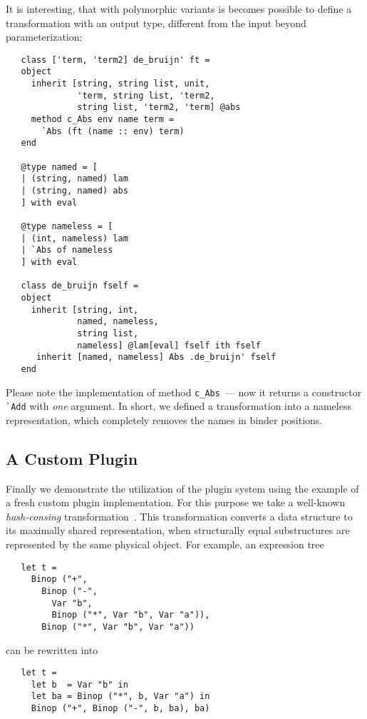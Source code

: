 It is interesting, that with polymorphic variants is becomes possible to define a transformation with an output type, different from the input
beyond parameterization:

\begin{lstlisting}
   class ['term, 'term2] de_bruijn' ft =
   object
     inherit [string, string list, unit,
              'term, string list, 'term2,
              string list, 'term2, 'term] @abs
     method c_Abs env name term =
       `Abs (ft (name :: env) term) 
   end
     
   @type named = [
   | (string, named) lam
   | (string, named) abs
   ] with eval
                     
   @type nameless = [
   | (int, nameless) lam
   | `Abs of nameless
   ] with eval

   class de_bruijn fself =
   object
     inherit [string, int,
              named, nameless,
              string list,
              nameless] @lam[eval] fself ith fself
      inherit [named, nameless] Abs .de_bruijn' fself 
   end
\end{lstlisting}

Please note the implementation of method \lstinline{c_Abs}~--- now it returns a constructor \lstinline{`Add} with \emph{one}
argument. In short, we defined a transformation into a nameless representation, which completely removes the names in binder
positions.

\subsection{A Custom Plugin}
\label{pluginExample}

Finally we demonstrate the utilization of the plugin system using the example of a fresh custom plugin implementation. For this purpose we
take a well-known \emph{hash-consing} transformation~\cite{HC}. This transformation converts a data structure to its maximally shared
representation, when structurally equal substructures are represented by the same physical object. For example, an expression tree

\begin{lstlisting}
   let t =
     Binop ("+",
       Binop ("-",
         Var "b",
         Binop ("*", Var "b", Var "a")),
       Binop ("*", Var "b", Var "a"))
\end{lstlisting}

can be rewritten into

\begin{lstlisting}
   let t =
     let b  = Var "b" in
     let ba = Binop ("*", b, Var "a") in
     Binop ("+", Binop ("-", b, ba), ba)  
\end{lstlisting}

